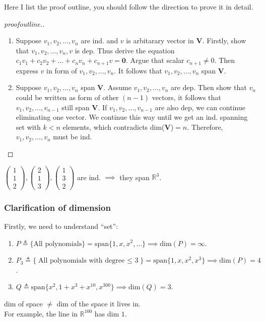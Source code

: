 Here I list the proof outline, you should follow the direction to prove it in detail.
\begin{proof}[proofoutline.]\qquad\\
\begin{enumerate}
\item
Suppose $v_1,v_2,\dots,v_n$ are ind. and $v$ is arbitarary vector in $\bm V$. Firstly, show that $v_1,v_2,\dots,v_n,v$ is dep. Thus derive the equation $c_1v_1+c_2v_2+\dots+c_{n}v_n+c_{n+1}v = \bm 0$. Argue that scalar $c_{n+1}\ne 0$. Then express $v$ in form of $v_1,v_2,\dots,v_n$. It follows that $v_1,v_2,\dots,v_n$ span $\bm V$.
\item
Suppose $v_1,v_2,\dots,v_n$ span $\bm V$. Assume $v_1,v_2,\dots,v_n$ are dep. Then show that $v_n$ could be written as form of other $(n-1)$ vectors, it follows that $v_1,v_2,\dots,v_{n-1}$ still span $\bm V$. If $v_1,v_2,\dots,v_{n-1}$ are also dep, we can continue eliminating one vector. We continue this way until we get an ind. spanning set with $k<n$ elements, which contradicts dim($\bm V$)$=n$. Therefore, $v_1,v_2,\dots,v_n$ must be ind.\end{enumerate}
\end{proof}
\enlargethispage{1cm}
\begin{example}\label{span_dimension_three}
$\begin{pmatrix}
1\\1\\2
\end{pmatrix},\begin{pmatrix}
2\\1\\3
\end{pmatrix},\begin{pmatrix}
1\\3\\2
\end{pmatrix}$ are ind. $\implies$ they span $\mathbb{R}^{3}$.
\end{example}
\newpage
\subsubsection{Clarification of dimension}
Firstly, we need to understand ``set'':
\begin{enumerate}
\item
$P\triangleq\{\text{All polynomials}\} = \text{span}\{1,x,x^2,\dots\}\implies \text{dim}(P)=\infty$.
\item
$P_3\triangleq\{\text{All polynomials with degree $\le$ 3}\} = \text{span}\{1,x,x^2,x^3\}\implies \text{dim}(P)=4$.
\item
$Q\triangleq\text{span}\{x^2,1+x^3+x^{10},x^{300}\}\implies \text{dim}(Q) = 3.$
\end{enumerate}
\begin{remark}
dim of space $\ne$ dim of the space it lives in.\\
For example, the line in $\mathbb{R}^{100}$ has dim $1$.
\end{remark}
